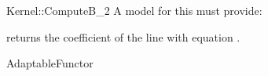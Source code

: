 \begin{ccRefFunctionObjectConcept}{Kernel::ComputeB_2}
A model for this must provide:


       {returns the coefficient  of the line with equation .}

\ccRefines
AdaptableFunctor



\end{ccRefFunctionObjectConcept}
